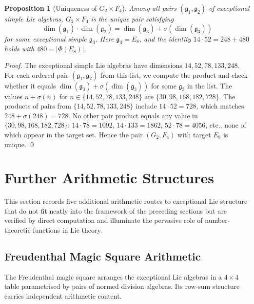 \documentclass[11pt]{amsart}
\theoremstyle{plain}
\newtheorem{proposition}[theorem]{Proposition}
\theoremstyle{definition}
\theoremstyle{remark}
\newcommand{\fg}{\mathfrak{g}}
\renewcommand{\Phi}{\varPhi}
\begin{document}
\begin{proposition}[Uniqueness of $G_2 \times F_4$]\label{prop:g2f4-unique}
Among all pairs $(\fg_1, \fg_2)$ of exceptional simple Lie algebras,
$G_2 \times F_4$ is the unique pair satisfying
\[
  \dim(\fg_1) \cdot \dim(\fg_2)
  = \dim(\fg_3) + \sigma(\dim(\fg_3))
\]
for some exceptional simple $\fg_3$.  Here $\fg_3 = E_8$, and the
identity $14 \cdot 52 = 248 + 480$ holds with $480 = |\Phi(E_8)|$.
\end{proposition}

\begin{proof}
The exceptional simple Lie algebras have dimensions $14, 52, 78, 133, 248$.
For each ordered pair $(\fg_1, \fg_2)$ from this list, we compute the
product and check whether it equals $\dim(\fg_3) + \sigma(\dim(\fg_3))$
for some $\fg_3$ in the list.  The values $n + \sigma(n)$ for
$n \in \{14, 52, 78, 133, 248\}$ are $\{30, 98, 168, 182, 728\}$.
The products of pairs from $\{14, 52, 78, 133, 248\}$ include
$14 \cdot 52 = 728$, which matches $248 + \sigma(248) = 728$.
No other pair product equals any value in $\{30, 98, 168, 182, 728\}$:
$14 \cdot 78 = 1092$, $14 \cdot 133 = 1862$, $52 \cdot 78 = 4056$,
etc., none of which appear in the target set.  Hence the pair
$(G_2, F_4)$ with target $E_8$ is unique. \qed
\end{proof}

\section{Further Arithmetic Structures}\label{sec:further-arithmetic}

This section records five additional arithmetic routes to exceptional Lie
structure that do not fit neatly into the framework of the preceding sections
but are verified by direct computation and illuminate the pervasive role of
number-theoretic functions in Lie theory.

\subsection{Freudenthal Magic Square Arithmetic}\label{sec:freudenthal-row}

The Freudenthal magic square arranges the exceptional Lie algebras in a
$4\times 4$ table parametrised by pairs of normed division algebras.
Its row-sum structure carries independent arithmetic content.
\end{document}
